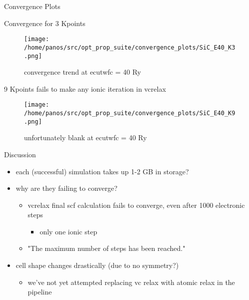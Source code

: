 \documentclass[8pt, compress]{beamer}
\begin{document}
\begin{frame}[allowframebreaks]{Convergence Plots}
\begin{block}{Convergence for 3 Kpoints}
\begin{figure}[htbp]
\centering
\texttt{[image: /home/panos/src/opt\_prop\_suite/convergence\_plots/SiC\_E40\_K3.png]}
\caption{\label{fig:Sice40k3} convergence trend at ecutwfc = 40 Ry}
\end{figure}
\end{block}
\begin{block}{9 Kpoints fails to make any ionic iteration in vcrelax}
\begin{figure}[htbp]
\centering
\texttt{[image: /home/panos/src/opt\_prop\_suite/convergence\_plots/SiC\_E40\_K9.png]}
\caption{\label{fig:Sice40k9} unfortunately blank at ecutwfc = 40 Ry}
\end{figure}
\end{block}
\end{frame}
\begin{frame}[label={sec:org5a679bd}]{Discussion}
\begin{itemize}
\item each (successful) simulation takes up 1-2 GB in storage?
\item why are they failing to converge?
\begin{itemize}
\item vcrelax final scf calculation fails to converge, even after 1000 electronic steps
\begin{itemize}
\item only one ionic step
\end{itemize}
\item "The maximum number of steps has been reached."
\end{itemize}
\item cell shape changes drastically (due to no symmetry?)
\begin{itemize}
\item we've not yet attempted replacing vc relax with atomic relax in the pipeline
\end{itemize}
\end{itemize}
\end{frame}
\end{document}
